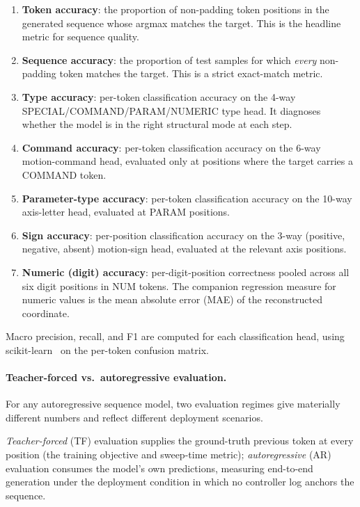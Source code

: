 \documentclass[sensors,article,submit,moreauthors,pdftex]{Definitions/mdpi}
\begin{document}
\begin{enumerate}
\item \textbf{Token accuracy}: the proportion of non-padding token positions in the generated sequence whose argmax matches the target. This is the headline metric for sequence quality.
\item \textbf{Sequence accuracy}: the proportion of test samples for which \emph{every} non-padding token matches the target. This is a strict exact-match metric.
\item \textbf{Type accuracy}: per-token classification accuracy on the 4-way SPECIAL/COMMAND/PARAM/NUMERIC type head. It diagnoses whether the model is in the right structural mode at each step.
\item \textbf{Command accuracy}: per-token classification accuracy on the 6-way motion-command head, evaluated only at positions where the target carries a COMMAND token.
\item \textbf{Parameter-type accuracy}: per-token classification accuracy on the 10-way axis-letter head, evaluated at PARAM positions.
\item \textbf{Sign accuracy}: per-position classification accuracy on the 3-way (positive, negative, absent) motion-sign head, evaluated at the relevant axis positions.
\item \textbf{Numeric (digit) accuracy}: per-digit-position correctness pooled across all six digit positions in NUM tokens. The companion regression measure for numeric values is the mean absolute error (MAE) of the reconstructed coordinate.
\end{enumerate}

Macro precision, recall, and F1 are computed for each classification head, using scikit-learn~\cite{pedregosa2011sklearn} on the per-token confusion matrix.

\paragraph{Teacher-forced vs.\ autoregressive evaluation.} For any autoregressive sequence model, two evaluation regimes give materially different numbers and reflect different deployment scenarios.

\emph{Teacher-forced} (TF) evaluation supplies the ground-truth previous token at every position (the training objective and sweep-time metric); \emph{autoregressive} (AR) evaluation consumes the model's own predictions, measuring end-to-end generation under the deployment condition in which no controller log anchors the sequence.
\end{document}
